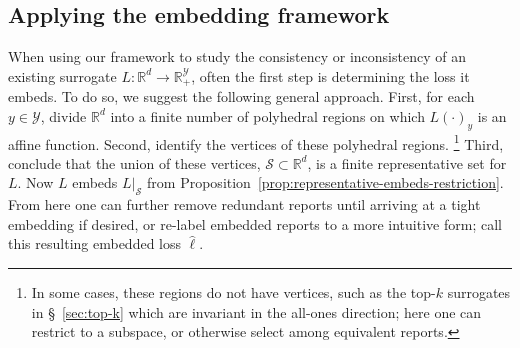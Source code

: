 \documentclass[twoside,11pt]{article}
\newcommand{\Comments}{1}
\newcommand{\mynote}[2]{\ifnum\Comments=1\textcolor{#1}{#2}\fi}
\newcommand{\jessie}[1]{\mynote{teal}{[JF: #1]}}
\newcommand{\reals}{\mathbb{R}}
\newcommand{\prop}[1]{\mathrm{prop}[#1]}
\newcommand{\Sc}{\mathcal{S}}
\newcommand{\Y}{\mathcal{Y}}
\begin{document}

\subsection{Applying the embedding framework}
\label{sec:apply-embedd-fram}

When using our framework to study the consistency or inconsistency of an existing surrogate $L:\reals^d \to \reals^\Y_+$, often the first step is determining the loss it embeds.
To do so, we suggest the following general approach.
First, for each $y\in\Y$, divide $\reals^d$ into a finite number of polyhedral regions on which $L(\cdot)_y$ is an affine function.
Second, identify the vertices of these polyhedral regions.%
\footnote{In some cases, these regions do not have vertices, such as the top-$k$ surrogates in \S~\ref{sec:top-k} which are invariant in the all-ones direction; here one can restrict to a subspace, or otherwise select among equivalent reports.}
Third, conclude that the union of these vertices, $\Sc\subset\reals^d$, is a finite representative set for $L$.
Now $L$ embeds $L|_\Sc$ from Proposition~\ref{prop:representative-embeds-restriction}.
From here one can further remove redundant reports until arriving at a tight embedding if desired, or re-label embedded reports to a more intuitive form; call this resulting embedded loss $\hat \ell$.
\end{document}
